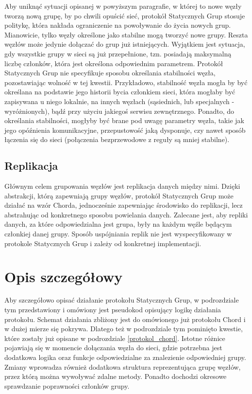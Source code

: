 \documentclass[12pt, twoside, openany]{report}
\begin{document}
Aby uniknąć sytuacji opisanej w powyższym paragrafie, w której to nowe węzły tworzą nową grupę, by po chwili opuścić sieć, protokół Statycznych Grup stosuje politykę, która nakłada ograniczenie na powoływanie do życia nowych grup. Mianowicie, tylko węzły określone jako stabilne mogą tworzyć nowe grupy. Reszta węzłów może jedynie dołączać do grup już istniejących. Wyjątkiem jest sytuacja, gdy wszystkie grupy w sieci są już przepełnione, tzn. posiadają maksymalną liczbę członków, która jest określona odpowiednim parametrem. Protokół Statycznych Grup nie specyfikuje sposobu określania stabilności węzła, pozostawiając wolność w tej kwestii. Przykładowo, stabilność węzła mogła by być określana na podstawie jego historii bycia członkiem sieci, która mogłaby być zapisywana u niego lokalnie, na innych węzłach (sąsiednich, lub specjalnych - wyróżnionych), bądź przy użyciu jakiegoś serwisu zewnętrznego. Ponadto, do określania stabilności, mogłyby być brane pod uwagę parametry węzła, takie jak jego opóźnienia komunikacyjne, przepustowość jaką dysponuje, czy nawet sposób łączenia się do sieci (połączenia bezprzewodowe z reguły są mniej stabilne).

\subsection{Replikacja}
Głównym celem grupowania węzłów jest replikacja danych między nimi. Dzięki abstrakcji, którą zapewniają grupy węzłów, protokół Statycznych Grup może działać na wzór Chorda, jednocześnie zapewniając środowisko do replikacji, lecz abstrahując od konkretnego sposobu powielania danych. Zalecane jest, aby repliki danych, za które odpowiedzialna jest grupa, były na każdym węźle będącym członkiej danej grupy. Sposób uspójniania replik nie jest wyspecyfikowany w protokole Statycznych Grup i zależy od konkretnej implementacji.

\section{Opis szczegółowy}

Aby szczegółowo opisać działanie protokołu Statycznych Grup, w podrozdziale tym przedstawiony i omówiony jest pseudokod opisujący logikę działania protokołu. Schemat działania zbliżony jest do omówionego już protokołu Chord i w dużej mierze się pokrywa. Dlatego też w podrozdziale tym pominięto kwestie, które zostały już opisane w podrozdziale \ref{protokol_chord}. Istotne różnice pojawiają się w momencie dołączania węzła do sieci, gdzie potrzebna jest dodatkowa logika oraz funkcje odpowiedzialne za znalezienie odpowiedniej grupy. Zmiany wprowadza również dodatkowa struktura reprezentująca grupę węzłów, przez którą można wywoływać zdalne metody. Ponadto dochodzi okresowe sprawdzanie poprawności członków grupy.
\end{document}
